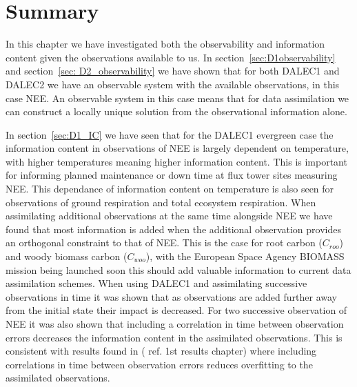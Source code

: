 \documentclass[11pt]{article}
\begin{document}
\section{Summary}

In this chapter we have investigated both the observability and information content given the observations available to us. In section~\ref{sec:D1observability} and section~\ref{sec: D2_observability} we have shown that for both DALEC1 and DALEC2 we have an observable system with the available observations, in this case NEE. An observable system in this case means that for data assimilation we can construct a locally unique solution from the observational information alone. 

In section~\ref{sec:D1_IC} we have seen that for the DALEC1 evergreen case the information content in observations of NEE is largely dependent on temperature, with higher temperatures meaning higher information content. This is important for informing planned maintenance or down time at flux tower sites measuring NEE. This dependance of information content on temperature is also seen for observations of ground respiration and total ecosystem respiration. When assimilating additional observations at the same time alongside NEE we have found that most information is added when the additional observation provides an orthogonal constraint to that of NEE. This is the case for root carbon (\(C_{roo}\)) and woody biomass carbon (\(C_{woo}\)), with the European Space Agency BIOMASS mission being launched soon this should add valuable information to current data assimilation schemes. When using DALEC1 and assimilating successive observations in time it was shown that as observations are added further away from the initial state their impact is decreased. For two successive observation of NEE it was also shown that including a correlation in time between observation errors decreases the information content in the assimilated observations. This is consistent with results found in ({\color{red} ref. 1st results chapter}) where including correlations in time between observation errors reduces overfitting to the assimilated observations.
\end{document}
